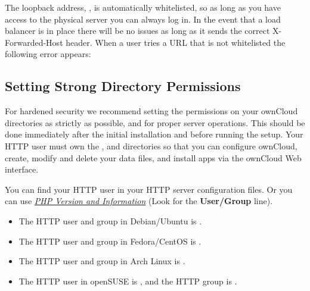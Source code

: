 \documentclass[letterpaper,10pt,english]{sphinxmanual}
\begin{document}
The loopback address, , is automatically whitelisted, so as long
as you have access to the physical server you can always log in. In the event
that a load balancer is in place there will be no issues as long as it sends
the correct X-Forwarded-Host header. When a user tries a URL that
is not whitelisted the following error appears:
\begin{figure}[htbp]
\centering

\end{figure}


\subsection{Setting Strong Directory Permissions}
\label{installation/installation_wizard:strong-perms-label}\label{installation/installation_wizard:setting-strong-directory-permissions}
For hardened security we recommend setting the permissions on your ownCloud
directories as strictly as possible, and for proper server operations. This
should be done immediately after the initial installation and before running the
setup. Your HTTP user must own the ,  and  directories
so that you can configure ownCloud, create, modify and delete your data files,
and install apps via the ownCloud Web interface.

You can find your HTTP user in your HTTP server configuration files. Or you can
use {\hyperref[issues/general_troubleshooting:label-phpinfo]{\emph{PHP Version and Information}}} (Look for the \textbf{User/Group} line).
\begin{itemize}
\item {} 
The HTTP user and group in Debian/Ubuntu is .

\item {} 
The HTTP user and group in Fedora/CentOS is .

\item {} 
The HTTP user and group in Arch Linux is .

\item {} 
The HTTP user in openSUSE is , and the HTTP group is .

\end{itemize}
\end{document}
